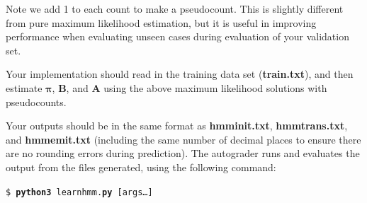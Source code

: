 \documentclass[11pt,addpoints,answers]{exam}
\begin{document}
Note we add 1 to each count to make a pseudocount. This is slightly different from pure maximum likelihood estimation, but it is useful in improving performance when evaluating unseen cases during evaluation of your validation set.

Your implementation should read in the training data set (\textbf{train.txt}), and then estimate $\bm\pi$, $\mathbf{B}$, and $\mathbf{A}$ using the above maximum likelihood solutions with pseudocounts. 

\clearpage
Your outputs should be in the same format as \textbf{hmminit.txt}, \textbf{hmmtrans.txt}, and \textbf{hmmemit.txt} (including the same number of decimal places to ensure there are no rounding errors during prediction). The autograder runs and evaluates the output from the files generated, using the following command:

\begin{tabbing}
\=\texttt{\$ \textbf{python3} learnhmm.\textbf{py} [args\dots]}\\
\end{tabbing}
\end{document}
